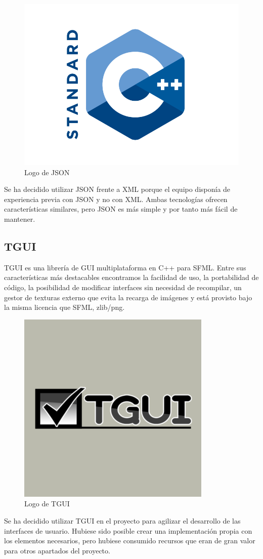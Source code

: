 		\begin{figure}[!htp]
			 \centering
			 \includegraphics{fig/cpp}
			 \caption{Logo de JSON}
			 \label{fig:json}
		\end{figure}

		Se ha decidido utilizar JSON frente a XML porque el equipo disponía de experiencia previa con JSON y no con XML. Ambas tecnologías ofrecen características similares, pero JSON es más simple y por tanto más fácil de mantener.

	\subsection{TGUI}

		TGUI es una librería de GUI multiplataforma en C++ para SFML. Entre sus características más destacables encontramos la facilidad de uso, la portabilidad de código, la posibilidad de modificar interfaces sin necesidad de recompilar, un gestor de texturas externo que evita la recarga de imágenes y está provisto bajo la misma licencia que SFML, zlib/png.

		\begin{figure}[!htp]
			 \centering
			 \includegraphics{fig/tgui}
			 \caption{Logo de TGUI}
			 \label{fig:tgui}
		\end{figure}

		Se ha decidido utilizar TGUI en el proyecto para agilizar el desarrollo de las interfaces de usuario. Hubiese sido posible crear una implementación propia con los elementos necesarios, pero hubiese consumido recursos que eran de gran valor para otros apartados del proyecto.
